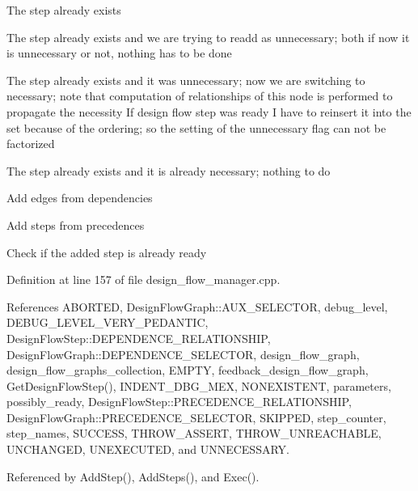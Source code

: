 The step already exists

The step already exists and we are trying to readd as unnecessary; both if now it is unnecessary or not, nothing has to be done

The step already exists and it was unnecessary; now we are switching to necessary; note that computation of relationships of this node is performed to propagate the necessity If design flow step was ready I have to reinsert it into the set because of the ordering; so the setting of the unnecessary flag can not be factorized

The step already exists and it is already necessary; nothing to do

Add edges from dependencies

Add steps from precedences

Check if the added step is already ready 

Definition at line 157 of file design\+\_\+flow\+\_\+manager.\+cpp.



References A\+B\+O\+R\+T\+ED, Design\+Flow\+Graph\+::\+A\+U\+X\+\_\+\+S\+E\+L\+E\+C\+T\+OR, debug\+\_\+level, D\+E\+B\+U\+G\+\_\+\+L\+E\+V\+E\+L\+\_\+\+V\+E\+R\+Y\+\_\+\+P\+E\+D\+A\+N\+T\+IC, Design\+Flow\+Step\+::\+D\+E\+P\+E\+N\+D\+E\+N\+C\+E\+\_\+\+R\+E\+L\+A\+T\+I\+O\+N\+S\+H\+IP, Design\+Flow\+Graph\+::\+D\+E\+P\+E\+N\+D\+E\+N\+C\+E\+\_\+\+S\+E\+L\+E\+C\+T\+OR, design\+\_\+flow\+\_\+graph, design\+\_\+flow\+\_\+graphs\+\_\+collection, E\+M\+P\+TY, feedback\+\_\+design\+\_\+flow\+\_\+graph, Get\+Design\+Flow\+Step(), I\+N\+D\+E\+N\+T\+\_\+\+D\+B\+G\+\_\+\+M\+EX, N\+O\+N\+E\+X\+I\+S\+T\+E\+NT, parameters, possibly\+\_\+ready, Design\+Flow\+Step\+::\+P\+R\+E\+C\+E\+D\+E\+N\+C\+E\+\_\+\+R\+E\+L\+A\+T\+I\+O\+N\+S\+H\+IP, Design\+Flow\+Graph\+::\+P\+R\+E\+C\+E\+D\+E\+N\+C\+E\+\_\+\+S\+E\+L\+E\+C\+T\+OR, S\+K\+I\+P\+P\+ED, step\+\_\+counter, step\+\_\+names, S\+U\+C\+C\+E\+SS, T\+H\+R\+O\+W\+\_\+\+A\+S\+S\+E\+RT, T\+H\+R\+O\+W\+\_\+\+U\+N\+R\+E\+A\+C\+H\+A\+B\+LE, U\+N\+C\+H\+A\+N\+G\+ED, U\+N\+E\+X\+E\+C\+U\+T\+ED, and U\+N\+N\+E\+C\+E\+S\+S\+A\+RY.



Referenced by Add\+Step(), Add\+Steps(), and Exec().

